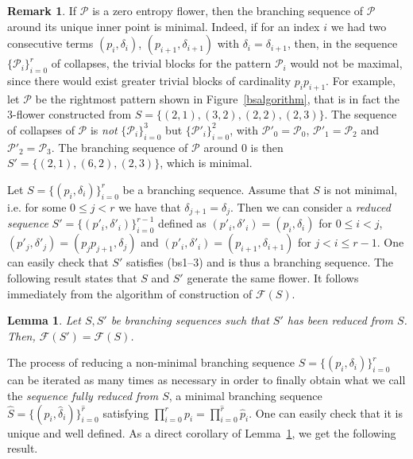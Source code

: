 \documentclass[a4paper]{amsart}
\newtheorem{lemma}[theorem]{Lemma}
\theoremstyle{definition}
\newtheorem{remark}[theorem]{Remark}
\begin{document}
\begin{remark}\label{florsminimals}
If $\mathcal{P}$ is a zero entropy flower, then the branching sequence of $\mathcal{P}$ around its unique inner point is minimal. Indeed, if for an index $i$ we had two consecutive terms $(p_i,\delta_i)$, $(p_{i+1},\delta_{i+1})$ with $\delta_i=\delta_{i+1}$, then, in the sequence $\{\mathcal{P}_i\}_{i=0}^r$ of collapses, the trivial blocks for the pattern $\mathcal{P}_i$ would not be maximal, since there would exist greater trivial blocks of cardinality $p_ip_{i+1}$. For example, let $\mathcal{P}$ be the rightmost pattern shown in Figure~\ref{bsalgorithm}, that is in fact the 3-flower constructed from $S=\{(2,1),(3,2),(2,2),(2,3)\}$. The sequence of collapses of $\mathcal{P}$ is \emph{not} $\{\mathcal{P}_i\}_{i=0}^3$ but $\{\mathcal{P}'_i\}_{i=0}^2$, with $\mathcal{P}'_0=\mathcal{P}_0$, $\mathcal{P}'_1=\mathcal{P}_2$ and $\mathcal{P}'_2=\mathcal{P}_3$. The branching sequence of $\mathcal{P}$ around 0 is then $S'=\{(2,1),(6,2),(2,3)\}$, which is minimal.
\end{remark}

Let $S=\{(p_i,\delta_i)\}_{i=0}^r$ be a branching sequence. Assume that $S$ is not minimal, i.e. for some $0\le j<r$ we have that $\delta_{j+1}=\delta_j$. Then we can consider a \emph{reduced sequence} $S'=\{(p'_i,\delta'_i)\}_{i=0}^{r-1}$ defined as $(p'_i,\delta'_i)=(p_i,\delta_i)$ for $0\le i<j$, $(p'_j,\delta'_j)=(p_jp_{j+1},\delta_j)$ and $(p'_i,\delta'_i)=(p_{i+1},\delta_{i+1})$ for $j<i\le r-1$. One can easily check that $S'$ satisfies (bs1--3) and is thus a branching sequence. The following result states that $S$ and $S'$ generate the same flower. It follows immediately from the algorithm of construction of $\mathcal{F}(S)$.

\begin{lemma}\label{bra1}
Let $S,S'$ be branching sequences such that $S'$ has been reduced from $S$. Then, $\mathcal{F}(S')=\mathcal{F}(S)$.
\end{lemma}

The process of reducing a non-minimal branching sequence $S=\{(p_i,\delta_i)\}_{i=0}^r$ can be iterated as many times as necessary in order to finally obtain what we call the \emph{sequence fully reduced from $S$}, a minimal branching sequence  $\widehat{S}=\{(\widehat{p}_i,\widehat{\delta}_i)\}_{i=0}^{\widehat{r}}$ satisfying $\prod_{i=0}^r p_i=\prod_{i=0}^{\widehat{r}} \widehat{p}_i$.
One can easily check that it is unique and well defined. As a direct corollary of Lemma~\ref{bra1}, we get the following result.
\end{document}
